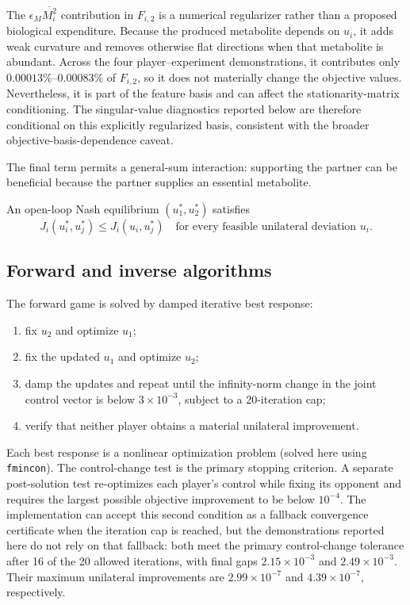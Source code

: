 \documentclass[11pt,a4paper]{article}
\begin{document}
The \(\epsilon_M\overline{M_i^2}\) contribution in \(F_{i,2}\) is a numerical
regularizer rather than a proposed biological expenditure. Because the
produced metabolite depends on \(u_i\), it adds weak curvature and removes
otherwise flat directions when that metabolite is abundant. Across the four
player--experiment demonstrations, it contributes only
\(0.00013\%\)--\(0.00083\%\) of \(F_{i,2}\), so it does not materially change
the objective values. Nevertheless, it is part of the feature basis and can
affect the stationarity-matrix conditioning. The singular-value diagnostics
reported below are therefore conditional on this explicitly regularized
basis, consistent with the broader objective-basis-dependence caveat.

The final term permits a general-sum interaction: supporting the partner can
be beneficial because the partner supplies an essential metabolite.

An open-loop Nash equilibrium
\((u_1^{*},u_2^{*})\) satisfies
\begin{equation}
  J_i(u_i^{*},u_j^{*})
  \le
  J_i(u_i,u_j^{*})
  \quad
  \text{for every feasible unilateral deviation }u_i.
\end{equation}

\subsection{Forward and inverse algorithms}

The forward game is solved by damped iterative best response:
\begin{enumerate}
  \item fix \(u_2\) and optimize \(u_1\);
  \item fix the updated \(u_1\) and optimize \(u_2\);
  \item damp the updates and repeat until the infinity-norm change in the
        joint control vector is below \(3\times10^{-3}\), subject to a
        20-iteration cap;
  \item verify that neither player obtains a material unilateral improvement.
\end{enumerate}
Each best response is a nonlinear optimization problem (solved here using \texttt{fmincon}). The control-change test is
the primary stopping criterion. A separate post-solution test re-optimizes
each player's control while fixing its opponent and requires the largest
possible objective improvement to be below \(10^{-4}\). The implementation
can accept this second condition as a fallback convergence certificate when
the iteration cap is reached, but the demonstrations reported here do not
rely on that fallback: both meet the primary control-change tolerance after
16 of the 20 allowed iterations, with final gaps \(2.15\times10^{-3}\) and
\(2.49\times10^{-3}\). Their maximum unilateral improvements are
\(2.99\times10^{-7}\) and \(4.39\times10^{-7}\), respectively.
\end{document}

